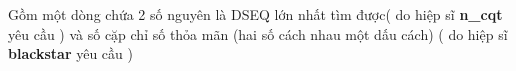 Gồm một dòng chứa 2 số nguyên là DSEQ lớn nhất tìm được( do hiệp sĩ \textbf{ n\_cqt } yêu cầu ) và số cặp chỉ số thỏa mãn (hai số cách nhau một dấu cách) ( do hiệp sĩ \textbf{ blackstar } yêu cầu )

\